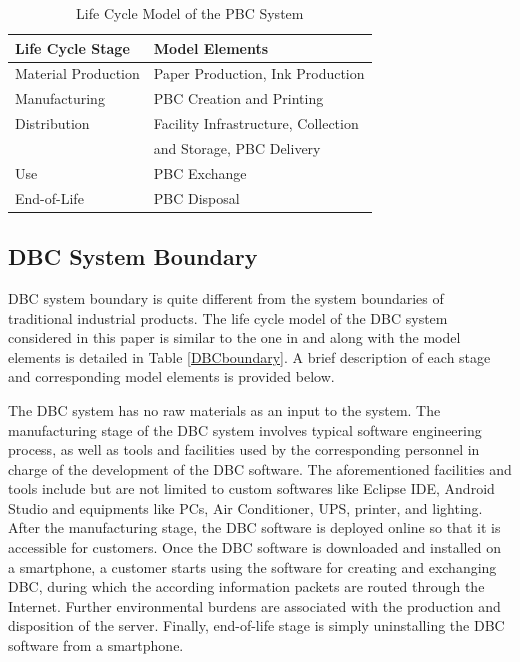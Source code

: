 \documentclass[conference]{IEEEtran}
\begin{document}
\begin{table}[h]
\caption{Life Cycle Model of the PBC System}
\centering
\begin{tabular}{|l|l|}
\hline
\textbf{Life Cycle Stage} & \textbf{Model Elements}           \\ \hline
Material Production       & Paper Production, Ink Production \\ \hline
Manufacturing             & PBC Creation and Printing        \\ \hline
Distribution              & Facility Infrastructure, Collection \\
& and Storage, PBC Delivery \\ \hline
Use                       & PBC Exchange                     \\ \hline
End-of-Life               & PBC Disposal                     \\ \hline
\end{tabular}
\label{PBCboundary}
\end{table}




\subsection{DBC System Boundary}\label{DBCBoundary}

DBC system boundary is quite different from the system boundaries of traditional industrial products. The life cycle model of the DBC system considered in this paper is similar to the one in \cite{Moshnyaga:2013, moshnyaga2013assessment} and along with the model elements is detailed in Table \ref{DBCboundary}. A brief description of each stage and corresponding model elements is provided below.

The DBC system has no raw materials as an input to the system. The manufacturing stage of the DBC system involves typical software engineering process, as well as tools and facilities used by the corresponding personnel in charge of the development of the DBC software. The aforementioned facilities and tools include but are not limited to custom softwares like Eclipse IDE, Android Studio and equipments like PCs, Air Conditioner, UPS, printer, and lighting. After the manufacturing stage, the DBC software is deployed online so that it is accessible for customers. Once the DBC software is downloaded and installed on a smartphone, a customer starts using the software for creating and exchanging DBC, during which the according information packets are routed through the Internet. Further environmental burdens are associated with the production and disposition of the server. Finally, end-of-life stage is simply uninstalling the DBC software from a smartphone. 
\end{document}
